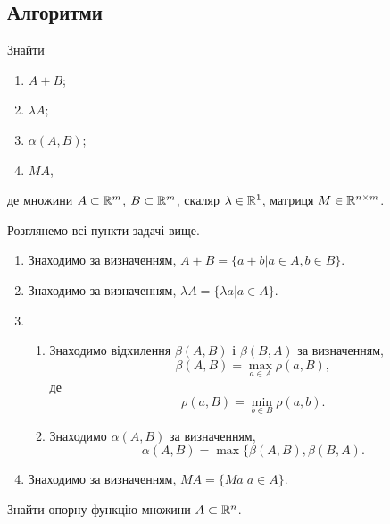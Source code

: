 \subsection{Алгоритми}

\begin{problem*}
	Знайти
	\begin{enumerate}
		\item $A+B$;
		\item $\lambda A$;
		\item $\alpha(A,B)$;
		\item $MA$,
	\end{enumerate}
	де множини $A \subset\mathbb{R}^m$, $B\subset\mathbb{R}^m$, скаляр $\lambda\in\mathbb{R}^1$, матриця $M\in\mathbb{R}^{n\times m}$.
\end{problem*}

\begin{algorithm}
	\label{algo-2-1}
	Розглянемо всі пункти задачі вище.
	\begin{enumerate}
		\item Знаходимо за визначенням, $A+B=\{a+b|a\in A,b\in B\}$.
		\item Знаходимо за визначенням, $\lambda A =\{\lambda a|a\in A\}$. 
		\item \begin{enumerate}
			\item Знаходимо відхилення $\beta(A,B)$ і $\beta(B,A)$ за визначенням, 
			\begin{equation}
				\label{eq:2.1}
				\beta(A,B) = \max_{a\in A}\rho(a,B),
			\end{equation}
			де 
			\begin{equation}
				\label{eq:2.2}
				\rho(a,B) = \min_{b\in B} \rho(a,b).
			\end{equation}
			\item Знаходимо $\alpha(A,B)$ за визначенням, 
			\begin{equation}
				\label{eq:2.3}
				\alpha(A,B)=\max\{\beta(A,B),\beta(B,A).
			\end{equation}
		\end{enumerate} 
		\item Знаходимо за визначенням, $MA=\{Ma|a\in A\}$.
	\end{enumerate}
\end{algorithm}

\vspace*{\baselineskip}

\begin{problem*}
	Знайти опорну функцію множини $A \subset \mathbb{R}^n$.
\end{problem*}

